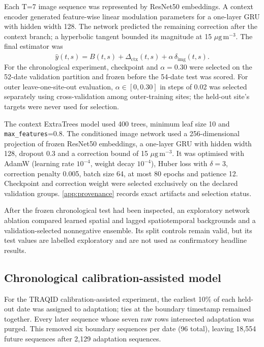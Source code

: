 \documentclass[review,12pt,authoryear]{elsarticle}
\newcommand{\ugm}{\ensuremath{\mu\mathrm{g}\,\mathrm{m}^{-3}}}
\begin{document}
Each T=7 image sequence was represented by ResNet50 embeddings. A context
encoder generated feature-wise linear modulation parameters for a one-layer GRU
with hidden width 128. The network predicted the remaining correction after the
context branch; a hyperbolic tangent bounded its magnitude at 15 \ugm. The
final estimator was
\begin{equation}
 \widehat y(t,s)=B(t,s)+\widehat\Delta_{\mathrm{ctx}}(t,s)
                 +\alpha\,\delta_{\mathrm{img}}(t,s).
 \label{eq:taiwan}
\end{equation}
For the chronological experiment, checkpoint and $\alpha=0.30$ were selected
on the 52-date validation partition and frozen before the 54-date test was
scored. For outer leave-one-site-out evaluation, $\alpha\in[0,0.30]$ in steps
of 0.02 was selected separately using cross-validation among outer-training
sites; the held-out site's targets were never used for selection.

The context ExtraTrees model used 400 trees, minimum leaf size 10 and
\texttt{max\_features}=0.8. The conditioned image network used a 256-dimensional
projection of frozen ResNet50 embeddings, a one-layer GRU with hidden width
128, dropout 0.3 and a correction bound of 15 \ugm. It was optimised with
AdamW (learning rate $10^{-4}$, weight decay $10^{-4}$), Huber loss with
$\delta=3$, correction penalty 0.005, batch size 64, at most 80 epochs and
patience 12. Checkpoint and correction weight were selected exclusively on the
declared validation groups. \ref{app:provenance} records exact
artifacts and selection status.

After the frozen chronological test had been inspected, an exploratory network
ablation compared learned spatial and lagged spatiotemporal backgrounds and a
validation-selected nonnegative ensemble. Its split controls remain valid, but
its test values are labelled exploratory and are not used as confirmatory
headline results.

\subsection{Chronological calibration-assisted model}

For the TRAQID calibration-assisted experiment, the earliest 10\% of each held-out
date was assigned to adaptation;
ties at the boundary timestamp remained together. Every later sequence whose
seven raw rows intersected adaptation was purged. This removed six boundary
sequences per date (96 total), leaving 18,554 future sequences after 2,129
adaptation sequences.
\end{document}

